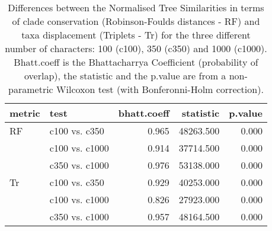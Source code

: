 \begin{table}[ht]
\centering
\begin{tabular}{llr|rr}
  \hline
metric & test & bhatt.coeff & statistic & p.value \\ 
  \hline
RF & c100 vs. c350 & 0.965 & 48263.500 & 0.000 \\ 
   & c100 vs. c1000 & 0.914 & 37714.500 & 0.000 \\ 
   & c350 vs. c1000 & 0.976 & 53138.000 & 0.000 \\ 
  Tr & c100 vs. c350 & 0.929 & 40253.000 & 0.000 \\ 
   & c100 vs. c1000 & 0.826 & 27923.000 & 0.000 \\ 
   & c350 vs. c1000 & 0.957 & 48164.500 & 0.000 \\ 
   \hline
\end{tabular}
\caption{Differences between the Normalised Tree Similarities in terms of clade conservation (Robinson-Foulds distances - RF) and taxa displacement (Triplets - Tr) for the three different number of characters: 100 (c100), 350 (c350) and 1000 (c1000). Bhatt.coeff is the Bhattacharrya Coefficient (probability of overlap), the statistic and the p.value are from a non-parametric Wilcoxon test (with Bonferonni-Holm correction).} 
\label{Tab_pooledscharacters_test}
\end{table}
